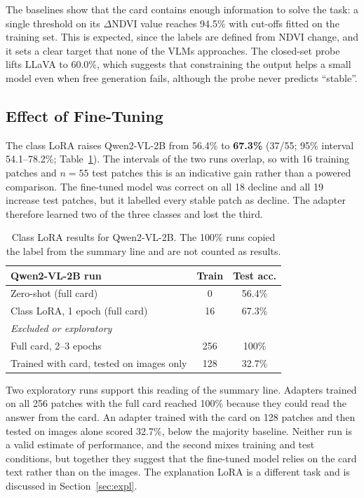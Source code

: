 \documentclass[11pt]{article}
\begin{document}
The baselines show that the card contains enough information to solve
the task: a single threshold on its $\Delta$NDVI value reaches 94.5\%
with cut-offs fitted on the training set. This is expected, since the
labels are defined from NDVI change, and it sets a clear target that
none of the VLMs approaches. The closed-set probe lifts LLaVA to 60.0\%,
which suggests that constraining the output helps a small model even
when free generation fails, although the probe never predicts
``stable''.

\subsection{Effect of Fine-Tuning}

The class LoRA raises Qwen2-VL-2B from 56.4\% to \textbf{67.3\%} (37/55;
95\% interval 54.1--78.2\%; Table~\ref{tab:lora}). The intervals of the
two runs overlap, so with 16 training patches and $n = 55$ test patches
this is an indicative gain rather than a powered comparison. The
fine-tuned model was correct on all 18 decline and all 19 increase test
patches, but it labelled every stable patch as decline. The adapter
therefore learned two of the three classes and lost the third.

\begin{table}[t]
\centering
\small
\begin{tabular}{lcc}
\toprule
Qwen2-VL-2B run & Train & Test acc. \\
\midrule
Zero-shot (full card) & 0 & 56.4\% \\
Class LoRA, 1 epoch (full card) & 16 & 67.3\% \\
\midrule
\multicolumn{3}{l}{\emph{Excluded or exploratory}} \\
Full card, 2--3 epochs & 256 & 100\% \\
Trained with card, tested on images only & 128 & 32.7\% \\
\bottomrule
\end{tabular}
\caption{Class LoRA results for Qwen2-VL-2B. The 100\% runs copied the
label from the summary line and are not counted as results.}
\label{tab:lora}
\end{table}

Two exploratory runs support this reading of the summary line. Adapters
trained on all 256 patches with the full card reached 100\% because
they could read the answer from the card. An adapter trained with the
card on 128 patches and then tested on images alone scored 32.7\%,
below the majority baseline. Neither run is a valid estimate of
performance, and the second mixes training and test conditions, but
together they suggest that the fine-tuned model relies on the card text
rather than on the images. The explanation LoRA is a
different task and is discussed in Section~\ref{sec:expl}.
\end{document}
